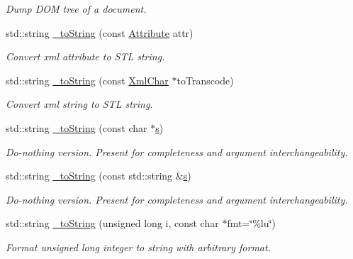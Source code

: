 \begin{DoxyCompactItemize}
\begin{DoxyCompactList}\small\item\em Dump DOM tree of a document. \item\end{DoxyCompactList}\item 
std::string \hyperlink{group___d_d4_h_e_p___x_m_l_gad2124529d3b80b7896b4d5a370ee906e}{\_\-toString} (const \hyperlink{namespace_d_d4hep_1_1_x_m_l_a5c19b7116be99d69b4b22d911357baaf}{Attribute} attr)
\begin{DoxyCompactList}\small\item\em Convert xml attribute to STL string. \item\end{DoxyCompactList}\item 
std::string \hyperlink{group___d_d4_h_e_p___x_m_l_ga4c56544a190950d18779b16e986783ab}{\_\-toString} (const \hyperlink{namespace_d_d4hep_1_1_x_m_l_a09e5d9cc86ed782f6826dfe0778c1815}{XmlChar} $\ast$toTranscode)
\begin{DoxyCompactList}\small\item\em Convert xml string to STL string. \item\end{DoxyCompactList}\item 
std::string \hyperlink{group___d_d4_h_e_p___x_m_l_ga7a1c3ef4f1a036d3ccccfd9fff8cd30f}{\_\-toString} (const char $\ast$\hyperlink{_volumes_8cpp_a17ca6bfc8040d695d3cada22a4763d40}{s})
\begin{DoxyCompactList}\small\item\em Do-\/nothing version. Present for completeness and argument interchangeability. \item\end{DoxyCompactList}\item 
std::string \hyperlink{group___d_d4_h_e_p___x_m_l_ga11593305fa28cb3f91fd4cb08e0aa670}{\_\-toString} (const std::string \&\hyperlink{_volumes_8cpp_a17ca6bfc8040d695d3cada22a4763d40}{s})
\begin{DoxyCompactList}\small\item\em Do-\/nothing version. Present for completeness and argument interchangeability. \item\end{DoxyCompactList}\item 
std::string \hyperlink{group___d_d4_h_e_p___x_m_l_ga52447f7eb531c40682ba02c1271c1030}{\_\-toString} (unsigned long i, const char $\ast$fmt=\char`\"{}\%lu\char`\"{})
\begin{DoxyCompactList}\small\item\em Format unsigned long integer to string with arbitrary format. \item\end{DoxyCompactList}\item 

\end{DoxyCompactItemize}
